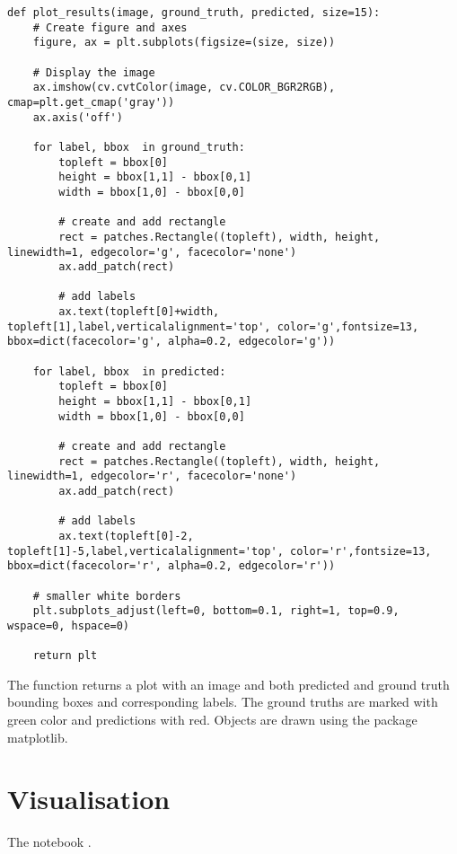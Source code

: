\begin{lstlisting}[caption=plot\_results]
def plot_results(image, ground_truth, predicted, size=15):
    # Create figure and axes
    figure, ax = plt.subplots(figsize=(size, size))

    # Display the image
    ax.imshow(cv.cvtColor(image, cv.COLOR_BGR2RGB), cmap=plt.get_cmap('gray'))
    ax.axis('off')

    for label, bbox  in ground_truth:
        topleft = bbox[0]
        height = bbox[1,1] - bbox[0,1]
        width = bbox[1,0] - bbox[0,0]

        # create and add rectangle
        rect = patches.Rectangle((topleft), width, height, linewidth=1, edgecolor='g', facecolor='none')
        ax.add_patch(rect)

        # add labels
        ax.text(topleft[0]+width, topleft[1],label,verticalalignment='top', color='g',fontsize=13, bbox=dict(facecolor='g', alpha=0.2, edgecolor='g'))

    for label, bbox  in predicted:
        topleft = bbox[0]
        height = bbox[1,1] - bbox[0,1]
        width = bbox[1,0] - bbox[0,0]

        # create and add rectangle
        rect = patches.Rectangle((topleft), width, height, linewidth=1, edgecolor='r', facecolor='none')
        ax.add_patch(rect)

        # add labels
        ax.text(topleft[0]-2, topleft[1]-5,label,verticalalignment='top', color='r',fontsize=13, bbox=dict(facecolor='r', alpha=0.2, edgecolor='r'))
    
    # smaller white borders
    plt.subplots_adjust(left=0, bottom=0.1, right=1, top=0.9, wspace=0, hspace=0)

    return plt 
\end{lstlisting}

The function  returns a plot with an image and both predicted and ground truth bounding boxes 
and corresponding labels. The ground truths are marked with green color and predictions with red. Objects are drawn using the package matplotlib.

\section{Visualisation}
 The notebook .